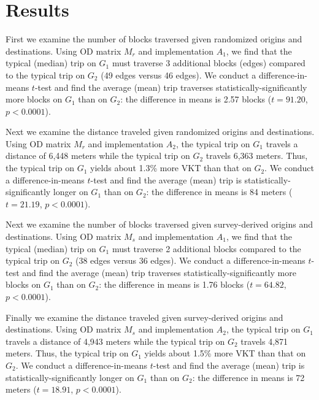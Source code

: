 \documentclass{article}
\begin{document}
\section{Results}

First we examine the number of blocks traversed given randomized origins and destinations. Using OD matrix $M_r$ and implementation $A_1$, we find that the typical (median) trip on $G_1$ must traverse 3 additional blocks (edges) compared to the typical trip on $G_2$ (49 edges versus 46 edges). We conduct a difference-in-means $t$-test and find the average (mean) trip traverses statistically-significantly more blocks on $G_1$ than on $G_2$: the difference in means is 2.57 blocks ($t=91.20$, $p<0.0001$).

Next we examine the distance traveled given randomized origins and destinations. Using OD matrix $M_r$ and implementation $A_2$, the typical trip on $G_1$ travels a distance of 6,448 meters while the typical trip on $G_2$ travels 6,363 meters. Thus, the typical trip on $G_1$ yields about 1.3\% more VKT than that on $G_2$. We conduct a difference-in-means $t$-test and find the average (mean) trip is statistically-significantly longer on $G_1$ than on $G_2$: the difference in means is 84 meters ($t=21.19$, $p<0.0001$).

Next we examine the number of blocks traversed given survey-derived origins and destinations. Using OD matrix $M_s$ and implementation $A_1$, we find that the typical (median) trip on $G_1$ must traverse 2 additional blocks compared to the typical trip on $G_2$ (38 edges versus 36 edges). We conduct a difference-in-means $t$-test and find the average (mean) trip traverses statistically-significantly more blocks on $G_1$ than on $G_2$: the difference in means is 1.76 blocks ($t=64.82$, $p<0.0001$).

Finally we examine the distance traveled given survey-derived origins and destinations. Using OD matrix $M_s$ and implementation $A_2$, the typical trip on $G_1$ travels a distance of 4,943 meters while the typical trip on $G_2$ travels 4,871 meters. Thus, the typical trip on $G_1$ yields about 1.5\% more VKT than that on $G_2$. We conduct a difference-in-means $t$-test and find the average (mean) trip is statistically-significantly longer on $G_1$ than on $G_2$: the difference in means is 72 meters ($t=18.91$, $p<0.0001$).
\end{document}
